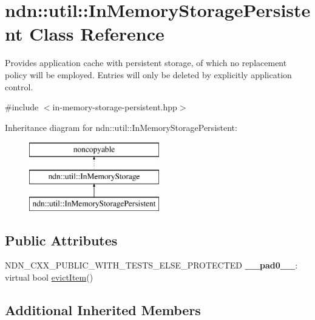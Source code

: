 \hypertarget{classndn_1_1util_1_1InMemoryStoragePersistent}{}\section{ndn\+:\+:util\+:\+:In\+Memory\+Storage\+Persistent Class Reference}
\label{classndn_1_1util_1_1InMemoryStoragePersistent}


Provides application cache with persistent storage, of which no replacement policy will be employed. Entries will only be deleted by explicitly application control.  




{\ttfamily \#include $<$in-\/memory-\/storage-\/persistent.\+hpp$>$}

Inheritance diagram for ndn\+:\+:util\+:\+:In\+Memory\+Storage\+Persistent\+:\begin{figure}[H]
\begin{center}
\leavevmode
\includegraphics[height=3.000000cm]{classndn_1_1util_1_1InMemoryStoragePersistent}
\end{center}
\end{figure}
\subsection*{Public Attributes}
\begin{DoxyCompactItemize}
\item 
N\+D\+N\+\_\+\+C\+X\+X\+\_\+\+P\+U\+B\+L\+I\+C\+\_\+\+W\+I\+T\+H\+\_\+\+T\+E\+S\+T\+S\+\_\+\+E\+L\+S\+E\+\_\+\+P\+R\+O\+T\+E\+C\+T\+ED {\bfseries \+\_\+\+\_\+pad0\+\_\+\+\_\+}\+: virtual bool \hyperlink{classndn_1_1util_1_1InMemoryStorage_a14036928e195645bf47d8c5686277fd8}{evict\+Item}()\hypertarget{classndn_1_1util_1_1InMemoryStoragePersistent_a9469b9c6b7587b8c3ffd7fae778a808a}{}\label{classndn_1_1util_1_1InMemoryStoragePersistent_a9469b9c6b7587b8c3ffd7fae778a808a}

\end{DoxyCompactItemize}
\subsection*{Additional Inherited Members}


